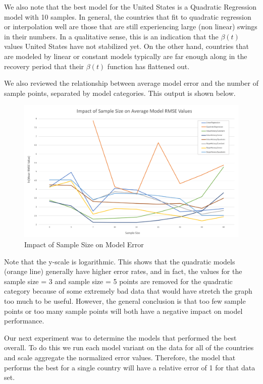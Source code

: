 \documentclass[11pt]{article}
\begin{document}
We also note that the best model for the United States is a Quadratic Regression model with 10 samples. In general, the countries that fit to quadratic regression or interpolation well are those that are still experiencing large (non linear) swings in their numbers. In a qualitative sense, this is an indication that the $\beta(t)$ values United States have not stabilized yet. On the other hand, countries that are modeled by linear or constant models typically are far enough along in the recovery period that their $\beta(t)$ function has flattened out.

We also reviewed the relationship between average model error and the number of sample points, separated by model categories. This output is shown below.

\begin{figure}
    \includegraphics[width=16cm]{images/SampleSizeGraph.png}
    \centering
    \caption{Impact of Sample Size on Model Error}
    \label{fig:sample-size-graph}
\end{figure}

Note that the y-scale is logarithmic. This shows that the quadratic models (orange line) generally have higher error rates, and in fact, the values for the sample size = 3 and sample size = 5 points are removed for the quadratic category because of some extremely bad data that would have stretch the graph too much to be useful. However, the general conclusion is that too few sample points or too many sample points will both have a negative impact on model performance.

Our next experiment was to determine the models that performed the best overall. To do this we run each model variant on the data for all of the countries and scale aggregate the normalized error values. Therefore, the model that performs the best for a single country will have a relative error of 1 for that data set.
\end{document}
